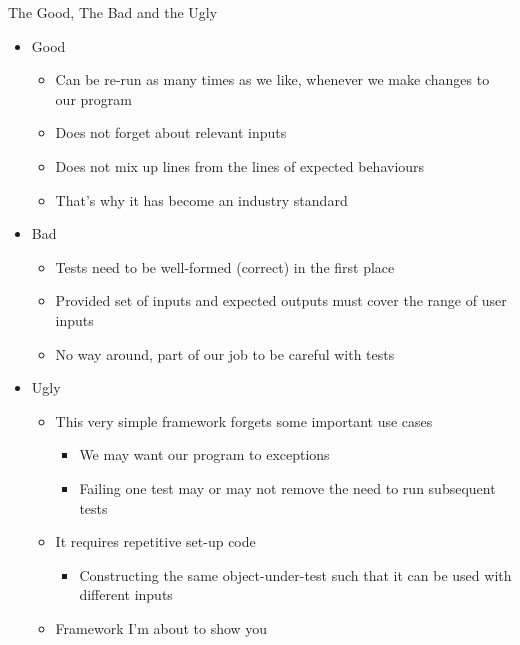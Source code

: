 \begin{frame}{The Good, The Bad and the Ugly}
%
\begin{itemize}
\item Good
	\begin{itemize}
	\item Can be re-run as many times as we like, \ie whenever we make changes to our program
	\item Does not forget about relevant inputs
	\item Does not mix up lines from the lines of expected behaviours
	\item[\Thus] That's why it has become an industry standard
	\end{itemize}
\pause
\item Bad
	\begin{itemize}
	\item Tests need to be well-formed (correct) in the first place
	\item Provided set of inputs and expected outputs must cover the range of user inputs
	\item[\Thus] No way around, part of our job to be careful with tests
	\end{itemize}
\pause
\item Ugly
	\begin{itemize}
	\item This very simple framework forgets some important use cases
		\begin{itemize}
		\item We may want our program to  exceptions
		\item Failing one test may or may not remove the need to run subsequent tests
		\end{itemize}
	\item It requires repetitive set-up code
		\begin{itemize}
		\item Constructing the same object-under-test such that it can be used with different inputs
		\end{itemize}
	\item[\Thus] Framework I'm about to show you
	\end{itemize}
\end{itemize}
%
\end{frame}


